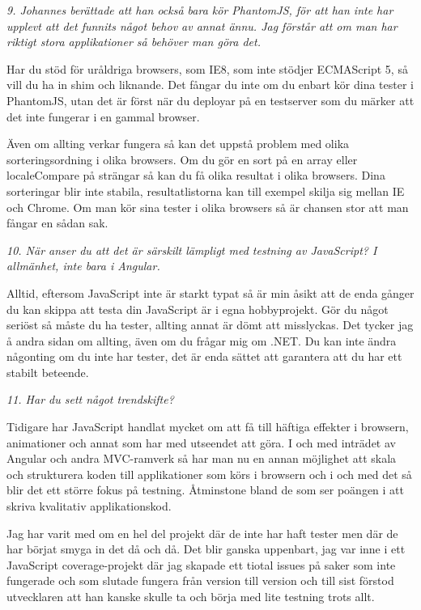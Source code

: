 \documentclass[11pt]{article}
\begin{document}
\emph{9. Johannes berättade att han också bara kör PhantomJS, för att han inte har upplevt att det funnits något behov av annat ännu. Jag förstår att om man har riktigt stora applikationer så behöver man göra det.}

Har du stöd för uråldriga browsers, som IE8, som inte stödjer ECMAScript 5, så vill du ha in shim och liknande. Det fångar du inte om du enbart kör dina tester i PhantomJS, utan det är först när du deployar på en testserver som du märker att det inte fungerar i en gammal browser.

Även om allting verkar fungera så kan det uppstå problem med olika sorteringsordning i olika browsers. Om du gör en sort på en array eller localeCompare på strängar så kan du få olika resultat i olika browsers. Dina sorteringar blir inte stabila, resultatlistorna kan till exempel skilja sig mellan IE och Chrome. Om man kör sina tester i olika browsers så är chansen stor att man fångar en sådan sak.

\emph{10. När anser du att det är särskilt lämpligt med testning av JavaScript? I allmänhet, inte bara i Angular.}

Alltid, eftersom JavaScript inte är starkt typat så är min åsikt att de enda gånger du kan skippa att testa din JavaScript är i egna hobbyprojekt. Gör du något seriöst så måste du ha tester, allting annat är dömt att misslyckas. Det tycker jag å andra sidan om allting, även om du frågar mig om .NET. Du kan inte ändra någonting om du inte har tester, det är enda sättet att garantera att du har ett stabilt beteende.

\emph{11. Har du sett något trendskifte?}

Tidigare har JavaScript handlat mycket om att få till häftiga effekter i browsern, animationer och annat som har med utseendet att göra. I och med inträdet av Angular och andra MVC-ramverk så har man nu en annan möjlighet att skala och strukturera koden till applikationer som körs i browsern och i och med det så blir det ett större fokus på testning. Åtminstone bland de som ser poängen i att skriva kvalitativ applikationskod.

Jag har varit med om en hel del projekt där de inte har haft tester men där de har börjat smyga in det då och då. Det blir ganska uppenbart, jag var inne i ett JavaScript coverage-projekt där jag skapade ett tiotal issues på saker som inte fungerade och som slutade fungera från version till version och till sist förstod utvecklaren att han kanske skulle ta och börja med lite testning trots allt.
\end{document}
